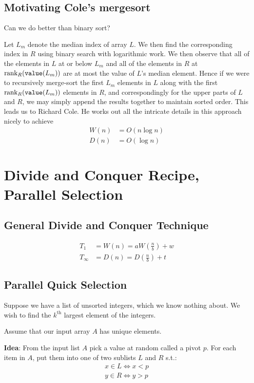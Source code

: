 \documentclass[11pt]{article}
\begin{document}
\subsection{Motivating Cole's mergesort}
\label{sec:org46adfd3}
Can we do better than binary sort?

Let \(L_m\) denote the median index of array \(L\). We then find the corresponding index
in \(R\) using binary search with logarithmic work. We then observe that all of the elements
in \(L\) at or below \(L_m\) and all of the elements in \(R\)
at \(\text{rank}_R(\texttt{value}(L_m))\) are at most the value of \(L\)'s median element. Hence if we
were to recursively merge-sort the first \(L_m\) elements in \(L\) along with the
first \(\text{rank}_R(\texttt{value}(L_m))\) elements in \(R\), and correspondingly for the upper
parts of \(L\) and \(R\), we may simply append the results together to maintain sorted order.
This leads us to Richard Cole\cite{doi:10.1137/0217049}. He works out all the intricate details
in this approach nicely to achieve
\begin{align*}
W(n)&=O(n\log n)\\
D(n)&=O(\log n)
\end{align*}
\section{Divide and Conquer Recipe, Parallel Selection}
\label{sec:orge5e8705}
\subsection{General Divide and Conquer Technique}
\label{sec:org9792b02}
\begin{align*}
T_1&=W(n)=aW(\frac{n}{b})+w\\
T_\infty&=D(n)=D(\frac{n}{b})+t
\end{align*}
\subsection{Parallel Quick Selection}
\label{sec:orge4367a3}
Suppose we have a list of unsorted integers, which we know nothing about. We wish to find
the \(k^{\text{th}}\) largest element of the integers.

Assume that our input array \(A\) has unique elements.

\textbf{Idea}: From the input list \(A\) pick a value at random called a pivot \(p\). For each item
in \(A\), put them into one of two sublists \(L\) and \(R\) s.t.:
\begin{gather*}
x\in L\Leftrightarrow x<p\\
y\in R\Leftrightarrow y>p
\end{gather*}
\end{document}

